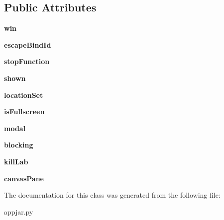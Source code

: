 \subsection*{Public Attributes}
\begin{DoxyCompactItemize}
\item 
\mbox{\label{class_python_01_g_u_i_1_1appjar_1_1_sub_window_abeccb9e3b007654729f936b708ca3238}} 
{\bfseries win}
\item 
\mbox{\label{class_python_01_g_u_i_1_1appjar_1_1_sub_window_a3d817f11b2e9a19e8e932876d0c30206}} 
{\bfseries escape\+Bind\+Id}
\item 
\mbox{\label{class_python_01_g_u_i_1_1appjar_1_1_sub_window_a6e23cc0b9034de7f917e472102ea0ead}} 
{\bfseries stop\+Function}
\item 
\mbox{\label{class_python_01_g_u_i_1_1appjar_1_1_sub_window_a5016cdd5581e914e862bc5087ddcc3ac}} 
{\bfseries shown}
\item 
\mbox{\label{class_python_01_g_u_i_1_1appjar_1_1_sub_window_a27ff9fdc6cfd935719aa690ba69d08df}} 
{\bfseries location\+Set}
\item 
\mbox{\label{class_python_01_g_u_i_1_1appjar_1_1_sub_window_a9262290d1569e01fc68e57789065c6fd}} 
{\bfseries is\+Fullscreen}
\item 
\mbox{\label{class_python_01_g_u_i_1_1appjar_1_1_sub_window_ac70a82fcac6b4a2c805414766903c0e5}} 
{\bfseries modal}
\item 
\mbox{\label{class_python_01_g_u_i_1_1appjar_1_1_sub_window_a0487322fab87558956e9c52c7257cf70}} 
{\bfseries blocking}
\item 
\mbox{\label{class_python_01_g_u_i_1_1appjar_1_1_sub_window_af8df268f2bf96afbe78260160e34cde4}} 
{\bfseries kill\+Lab}
\item 
\mbox{\label{class_python_01_g_u_i_1_1appjar_1_1_sub_window_a0ef7e50ec31992413fd784429ab0ddcc}} 
{\bfseries canvas\+Pane}
\end{DoxyCompactItemize}


The documentation for this class was generated from the following file\+:\begin{DoxyCompactItemize}
\item 
appjar.\+py\end{DoxyCompactItemize}
